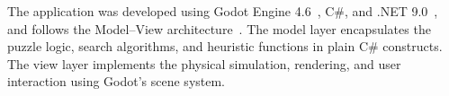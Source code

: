 The application was developed using Godot Engine 4.6~\cite{godot_engine}, C\#, and .NET 9.0~\cite{dotnet9}, and follows the Model--View architecture~\cite{krasner1988mvc}. The model layer encapsulates the puzzle logic, search algorithms, and heuristic functions in plain C\# constructs. The view layer implements the physical simulation, rendering, and user interaction using Godot's scene system.
